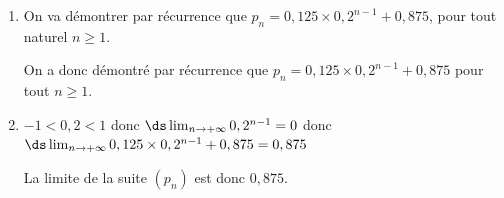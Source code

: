 \begin{enumerate}
	\begin{enumerate}
		\item Le programme qui permet d'afficher les $n$ premiers termes de la suite $(p_n)$ est le .
		
En effet, le  donne $n+1$ termes, et le  donne des valeurs supérieures à 1.		
		
		\item Avec le programme , le résultat affiché pour $n = 5$ sera la liste $\left [p_1\;,\; p_2 \;,\; p_3 \;,\; p_4 \;,\; p_5 \strut \right  ]$.
		
$p_1=1$; $p_2=0,9$; $p_3 = 0,88$;
$p_4 = 0,2p_3 + 0,7 = 0,2\times 0,88 + 0,7 = 0,876$	 et\\
$p_5 = 0,2p_4 + 0,7 = 0,2\times 0,876 + 0,7 = \np{0,8752}$
		
Le résultat affiché par \texttt{repas(5)} sera donc $\left [1\;;\; 0,9 \;;\; 0,88 \;;\; 0,876 \;;\; \np{0,8752} \strut \right]$.
		
	\end{enumerate}
\item On va démontrer par récurrence que $p_n = 0,125 \times 0,2^{n - 1} + 0,875$, pour tout naturel $n \geqslant 1$.


On a donc  démontré par récurrence que $p_{n}= 0,125 \times 0,2^{n -1} + 0,875$ pour tout $n\geqslant 1$.

\item 
$-1<0,2<1$ donc $\ds\lim_{n\to +\infty} 0,2^{n-1}=0$ donc  $\ds\lim_{n\to +\infty} 0,125 \times0,2^{n-1} + 0,875 = 0,875$

La limite de la suite $(p_n)$ est donc $0,875$.
\end{enumerate}

\bigskip
